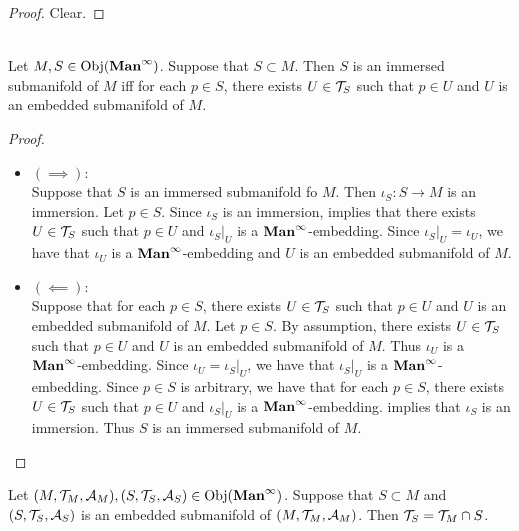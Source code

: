 \documentclass{book}
\begin{document}
	\begin{proof}
		Clear.
	\end{proof}

	\begin{ex}   \\
		Let $M, S \in \operatorname{Obj}(\operatorname*{\text{\textbf{Man}}^{\infty}})$. Suppose that $S \subset M$. Then $S$ is an immersed submanifold of $M$ iff for each $p \in S$, there exists $U \in \mathcal{T}_S$ such that $p \in U$ and $U$ is an embedded submanifold of $M$.
	\end{ex}

	\begin{proof}\
		\begin{itemize}
			\item $(\implies):$ \\
			Suppose that $S$ is an immersed submanifold fo $M$. Then $\iota_S:S \rightarrow M$ is an immersion. Let $p \in S$. Since $\iota_S$ is an immersion,  implies that there exists $U \in \mathcal{T}_S$ such that $p \in U$ and $\iota_S|_U$ is a $\operatorname*{\text{\textbf{Man}}^{\infty}}$-embedding. Since $\iota_S|_U = \iota_U$, we have that $\iota_U$ is a $\operatorname*{\text{\textbf{Man}}^{\infty}}$-embedding and $U$ is an embedded submanifold of $M$.
			\item $(\impliedby):$ \\
			Suppose that for each $p \in S$, there exists $U \in \mathcal{T}_S$ such that $p \in U$ and $U$ is an embedded submanifold of $M$. Let $p \in S$. By assumption, there exists  $U \in \mathcal{T}_S$ such that $p \in U$ and $U$ is an embedded submanifold of $M$. Thus $\iota_U$ is a $\operatorname*{\text{\textbf{Man}}^{\infty}}$-embedding. Since $\iota_U = \iota_S|_U$, we have that $\iota_S|_U$ is a $\operatorname*{\text{\textbf{Man}}^{\infty}}$-embedding. Since $p \in S$ is arbitrary, we have that for each $p \in S$, there exists $U \in \mathcal{T}_S$ such that $p \in U$ and $\iota_S|_U$ is a $\operatorname*{\text{\textbf{Man}}^{\infty}}$-embedding.  implies that $\iota_S$ is an immersion. Thus $S$ is an immersed submanifold of $M$.
		\end{itemize}
	\end{proof}

	\begin{ex}   
		Let $(M, \mathcal{T}_M, \mathcal{A}_M), (S, \mathcal{T}_S, \mathcal{A}_S) \in \operatorname{Obj}(\operatorname*{\text{\textbf{Man}}^{\infty}})$. Suppose that $S \subset M$ and $(S, \mathcal{T}_S, \mathcal{A}_S)$ is an embedded submanifold of $(M, \mathcal{T}_M, \mathcal{A}_M)$. Then $\mathcal{T}_S = \mathcal{T}_M \cap S$. 
	\end{ex}
	
\end{document}
